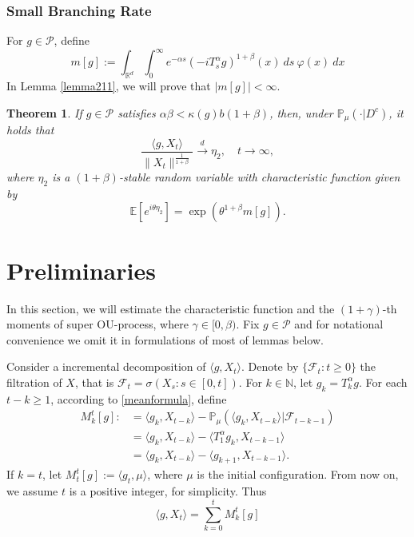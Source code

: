 \documentclass{article}
\newtheorem{theorem}{Theorem}[section]
\begin{document}
\subsubsection{Small Branching Rate}

For $g\in \mathcal{P}$, define
$$m[g]:=\int_{\mathbb{R}^d}\int_0^{\infty} e^{-\alpha s}(-iT_{s}^{\alpha}g)^{1+\beta}(x)~ds~\varphi(x)~dx$$
In Lemma \ref{lemma211}, we will prove that $|m[g]|<\infty$.
\begin{theorem}\label{Theorem13}
    If $g\in\mathcal{P}$ satisfies  $\alpha\beta<\kappa(g)b(1+\beta)$, then, under $\mathbb{P}_{\mu}(\cdot|D^c)$, it holds that
    $$\frac{\langle g,X_t\rangle}{\|X_t\|^{\frac{1}{1+\beta}}}\xrightarrow{d} \eta_2, \quad t\rightarrow \infty,$$
    where $\eta_2$ is a $(1+\beta)$-stable random variable with characteristic function given by 
    $$\mathbb{E} [e^{i\theta \eta_2}]=\exp(\theta^{1+\beta}m[g]).$$
\end{theorem}

\section{Preliminaries}
In this section, we will estimate the characteristic function and the $(1+\gamma)$-th moments of super OU-process, where $\gamma \in [0,\beta)$. Fix $g\in \mathcal{P}$ and for notational convenience we omit it in formulations of most of lemmas below.

Consider a incremental decomposition of $\langle g,X_t \rangle$. Denote by $\{\mathcal{F}_t:t\geq 0\}$ the filtration of $X$, that is $\mathcal{F}_t=\sigma(X_s:s\in [0,t])$. For $k \in \mathbb{N}$, let $g_k=T^{\alpha}_k g$. For each $t-k\geq 1$, according to \eqref{meanformula}, define
\begin{align*}
    M_k^t[g]:&=\langle g_k, X_{t-k}\rangle-\mathbb{P}_{\mu}(\langle g_k,X_{t-k}\rangle|\mathcal{F}_{t-k-1})\\
    &=\langle g_k, X_{t-k}\rangle-\langle T_1^{\alpha}g_{k},X_{t-k-1}\rangle\\
    &=\langle g_k, X_{t-k}\rangle-\langle g_{k+1},X_{t-k-1}\rangle.
\end{align*}
If $k=t$, let $M_t^t[g]:=\langle g_t,\mu\rangle$, where $\mu $ is the initial configuration. From now on, we assume $t$ is a positive integer, for simplicity. Thus
\begin{equation}\label{decomposition}
    \langle g,X_t\rangle=\sum_{k=0}^{t}M_k^t[g]
\end{equation}
\end{document}
